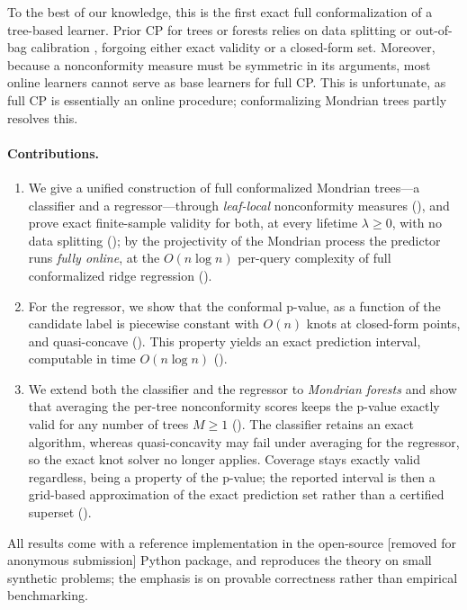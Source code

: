 \documentclass[twoside]{article}
\numberwithin{equation}{section}
\theoremstyle{plain}
\theoremstyle{definition}
\theoremstyle{remark}
\begin{document}
    To the best of our knowledge, this is the first exact full conformalization of a tree-based learner. Prior CP for trees or forests relies on data splitting or out-of-bag calibration \citep{papadopoulos2002inductive, johansson2014regression}, forgoing either exact validity or a closed-form set. Moreover, because a nonconformity measure must be symmetric in its arguments, most online learners cannot serve as base learners for full CP. This is unfortunate, as full CP is essentially an online procedure; conformalizing Mondrian trees partly resolves this.

    \paragraph{Contributions.}
    \begin{enumerate}[label=\textup{(\roman*)}, leftmargin=*, nosep]
        \item 
        We give a unified construction of full conformalized Mondrian trees---a classifier and a regressor---through \emph{leaf-local} nonconformity measures  (), and prove exact finite-sample validity for both, at every lifetime $\lambda \ge 0$, with no data splitting (); by the projectivity of the Mondrian process the predictor runs \emph{fully online}, at the $O(n\log n)$ per-query complexity of full conformalized ridge regression ().
        \item 
        For the regressor, we show that the conformal p-value, as a function of the candidate label is piecewise constant with $O(n)$ knots at closed-form points, and quasi-concave (). This property yields an exact prediction interval, computable in time $O(n\log n)$ ().
        \item 
        We extend both the classifier and the regressor to \emph{Mondrian forests} and show that averaging the per-tree nonconformity scores keeps the p-value exactly valid for any number of trees $M \geq 1$ (). The classifier retains an exact algorithm, whereas quasi-concavity may fail under averaging for the regressor, so the exact knot solver no longer applies. Coverage stays exactly valid regardless, being a property of the p-value; the reported interval is then a grid-based approximation of the exact prediction set rather than a certified superset ().
    \end{enumerate}
    All results come with a reference implementation in the open-source [removed for anonymous submission] Python package, and  reproduces the theory on small synthetic problems; the emphasis is on provable correctness rather than empirical benchmarking.
\end{document}
